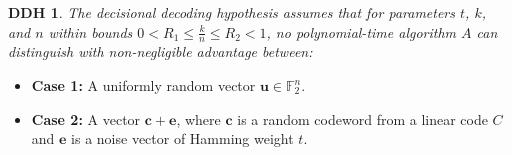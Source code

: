 \newtheorem*{ddh}{DDH}
\begin{ddh}
The decisional decoding hypothesis assumes that for parameters \( t \), \( k \), and \( n \) within bounds \( 0 < R_1 \leq \frac{k}{n} \leq R_2 < 1 \), no polynomial-time algorithm \( A \) can distinguish with non-negligible advantage between:
\end{ddh}
\begin{itemize}
    \item \textbf{Case 1:} A uniformly random vector \( \mathbf{u} \in \mathbb{F}_2^n \).
    \item \textbf{Case 2:} A vector \( \mathbf{c} + \mathbf{e} \), where \( \mathbf{c} \) is a random codeword from a linear code \( C \) and \( \mathbf{e} \) is a noise vector of Hamming weight \( t \).
\end{itemize}
